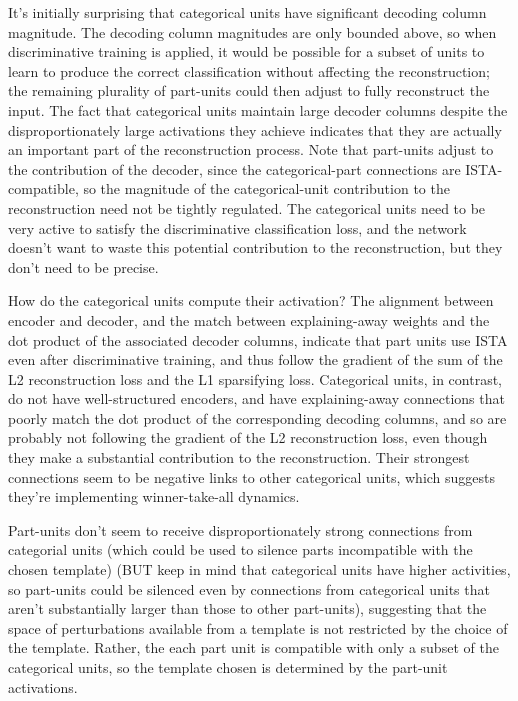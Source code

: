 \documentclass{article} %
\begin{document}
It's initially surprising that categorical units have significant decoding column magnitude.  The decoding column magnitudes are only bounded above, so when discriminative training is applied, it would be possible for a subset of units to learn to produce the correct classification without affecting the reconstruction; the remaining plurality of part-units could then adjust to fully reconstruct the input.  The fact that categorical units maintain large decoder columns despite the disproportionately large activations they achieve indicates that they are actually an important part of the reconstruction process.  Note that part-units adjust to the contribution of the decoder, since the categorical-part connections are ISTA-compatible, so the magnitude of the categorical-unit contribution to the reconstruction need not be tightly regulated.  The categorical units need to be very active to satisfy the discriminative classification loss, and the network doesn't want to waste this potential contribution to the reconstruction, but they don't need to be precise.

How do the categorical units compute their activation?  The alignment between encoder and decoder, and the match between explaining-away weights and the dot product of the associated decoder columns, indicate that part units use ISTA even after discriminative training, and thus follow the gradient of the sum of the L2 reconstruction loss and the L1 sparsifying loss.  Categorical units, in contrast, do not have well-structured encoders, and have explaining-away connections that poorly match the dot product of the corresponding decoding columns, and so are probably not following the gradient of the L2 reconstruction loss, even though they make a substantial contribution to the reconstruction.  Their strongest connections seem to be negative links to other categorical units, which suggests they're implementing winner-take-all dynamics.  

Part-units don't seem to receive disproportionately strong connections from categorial units (which could be used to silence parts incompatible with the chosen template) (BUT keep in mind that categorical units have higher activities, so part-units could be silenced even by connections from categorical units that aren't substantially larger than those to other part-units), suggesting that the space of perturbations available from a template is not restricted by the choice of the template.  Rather, the each part unit is compatible with only a subset of the categorical units, so the template chosen is determined by the part-unit activations.  
\end{document}
